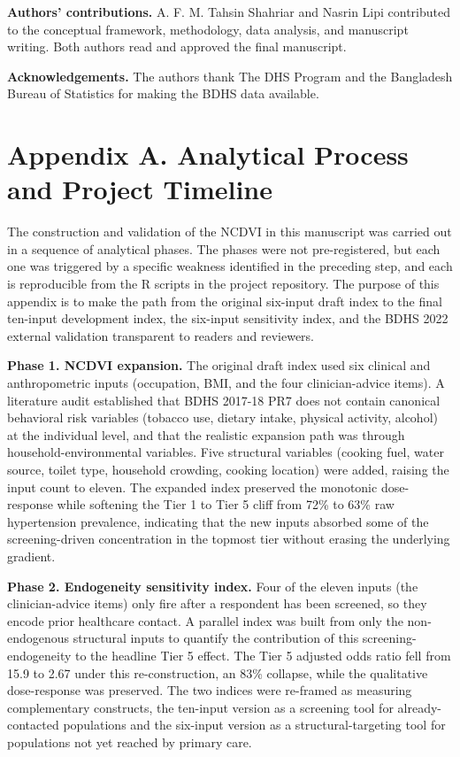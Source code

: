 \documentclass[
  12pt,
  a4paper]{article}
\begin{document}
\textbf{Authors' contributions.} A. F. M. Tahsin Shahriar and Nasrin Lipi contributed to the conceptual framework, methodology, data analysis, and manuscript writing. Both authors read and approved the final manuscript.

\textbf{Acknowledgements.} The authors thank The DHS Program and the Bangladesh Bureau of Statistics for making the BDHS data available.



\newpage
\appendix

\section*{Appendix A. Analytical Process and Project Timeline}\label{appendix-a.-analytical-process-and-project-timeline}

The construction and validation of the NCDVI in this manuscript was carried out in a sequence of analytical phases. The phases were not pre-registered, but each one was triggered by a specific weakness identified in the preceding step, and each is reproducible from the R scripts in the project repository. The purpose of this appendix is to make the path from the original six-input draft index to the final ten-input development index, the six-input sensitivity index, and the BDHS 2022 external validation transparent to readers and reviewers.

\textbf{Phase 1. NCDVI expansion.} The original draft index used six clinical and anthropometric inputs (occupation, BMI, and the four clinician-advice items). A literature audit established that BDHS 2017-18 PR7 does not contain canonical behavioral risk variables (tobacco use, dietary intake, physical activity, alcohol) at the individual level, and that the realistic expansion path was through household-environmental variables. Five structural variables (cooking fuel, water source, toilet type, household crowding, cooking location) were added, raising the input count to eleven. The expanded index preserved the monotonic dose-response while softening the Tier 1 to Tier 5 cliff from 72\% to 63\% raw hypertension prevalence, indicating that the new inputs absorbed some of the screening-driven concentration in the topmost tier without erasing the underlying gradient.

\textbf{Phase 2. Endogeneity sensitivity index.} Four of the eleven inputs (the clinician-advice items) only fire after a respondent has been screened, so they encode prior healthcare contact. A parallel index was built from only the non-endogenous structural inputs to quantify the contribution of this screening-endogeneity to the headline Tier 5 effect. The Tier 5 adjusted odds ratio fell from 15.9 to 2.67 under this re-construction, an 83\% collapse, while the qualitative dose-response was preserved. The two indices were re-framed as measuring complementary constructs, the ten-input version as a screening tool for already-contacted populations and the six-input version as a structural-targeting tool for populations not yet reached by primary care.
\end{document}
